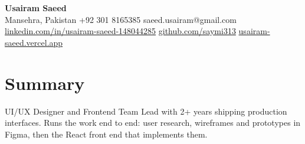 \documentclass[11pt,letterpaper]{article}
\begin{document}
\begin{center}
  {\fontsize{17}{20}\selectfont\bfseries Usairam Saeed}\\[0.3em]
  {\small Mansehra, Pakistan \textbar{} +92 301 8165385 \textbar{} saeed.usairam@gmail.com \textbar{} \href{https://www.linkedin.com/in/usairam-saeed-148044285/}{linkedin.com/in/usairam-saeed-148044285} \textbar{} \href{https://github.com/saymi313}{github.com/saymi313} \textbar{} \href{https://usairam-saeed.vercel.app/}{usairam-saeed.vercel.app}}
\end{center}


\section{Summary}
UI/UX Designer and Frontend Team Lead with 2+ years shipping production interfaces. Runs the work end to end: user research, wireframes and prototypes in Figma, then the React front end that implements them.
\end{document}
